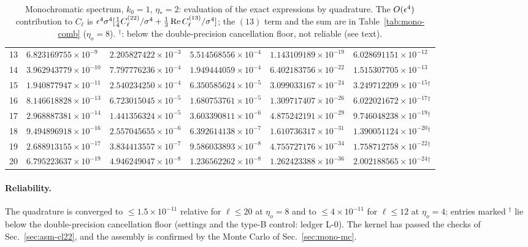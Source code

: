\begin{table}[t]
\begin{tabular}{r|lll|ll}
13 & $6.823169755{\times}10^{-9}$ & $2.205827422{\times}10^{-3}$ & $5.514568556{\times}10^{-4}$ & $1.143109189{\times}10^{-19}$ & $6.028691151{\times}10^{-12}$\\
14 & $3.962943779{\times}10^{-10}$ & $7.797776236{\times}10^{-4}$ & $1.949444059{\times}10^{-4}$ & $6.402183756{\times}10^{-22}$ & $1.515307705{\times}10^{-13}$\\
15 & $1.940877947{\times}10^{-11}$ & $2.540234250{\times}10^{-4}$ & $6.350585624{\times}10^{-5}$ & $3.099033167{\times}10^{-24}$ & $3.249712209{\times}10^{-15}$$^\dagger$\\
16 & $8.146618828{\times}10^{-13}$ & $6.723015045{\times}10^{-5}$ & $1.680753761{\times}10^{-5}$ & $1.309717407{\times}10^{-26}$ & $6.022021672{\times}10^{-17}$$^\dagger$\\
17 & $2.968887381{\times}10^{-14}$ & $1.441356324{\times}10^{-5}$ & $3.603390811{\times}10^{-6}$ & $4.875242191{\times}10^{-29}$ & $9.746048238{\times}10^{-19}$$^\dagger$\\
18 & $9.494896918{\times}10^{-16}$ & $2.557045655{\times}10^{-6}$ & $6.392614138{\times}10^{-7}$ & $1.610736317{\times}10^{-31}$ & $1.390051124{\times}10^{-20}$$^\dagger$\\
19 & $2.688913155{\times}10^{-17}$ & $3.834413557{\times}10^{-7}$ & $9.586033893{\times}10^{-8}$ & $4.755727176{\times}10^{-34}$ & $1.758712758{\times}10^{-22}$$^\dagger$\\
20 & $6.795223637{\times}10^{-19}$ & $4.946249047{\times}10^{-8}$ & $1.236562262{\times}10^{-8}$ & $1.262423388{\times}10^{-36}$ & $2.002188565{\times}10^{-24}$$^\dagger$\\
\hline
\end{tabular}
\caption{Monochromatic spectrum, $k_0=1$, $\eta_*=2$: evaluation of the exact expressions by quadrature.  The $O(\epsilon^4)$ contribution
to $C_\ell$ is $\epsilon^4\sigma^4[\tfrac14C^{(22)}_\ell/\sigma^4+\tfrac13\operatorname{Re} C^{(13)}_\ell/\sigma^4]$; the $(13)$ term and the sum are in
Table~\ref{tab:mono-comb} ($\eta_o=8$).  $^\dagger$: below the double-precision cancellation floor, not reliable (see text).}
\label{tab:mono}
\end{table}

\paragraph{Reliability.}  The quadrature is converged to $\le1.5\times10^{-11}$ relative for $\ell\le20$ at $\eta_o=8$ and to $\le4\times10^{-11}$
for $\ell\le12$ at $\eta_o=4$; entries marked $^\dagger$ lie below the double-precision cancellation floor (settings and the type-B control: ledger L-0).
The kernel has passed the checks of Sec.~\ref{sec:asm-cl22}, and the assembly is confirmed by the Monte Carlo of Sec.~\ref{sec:mono-mc}.

